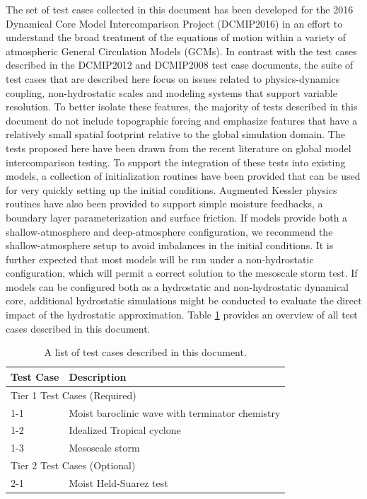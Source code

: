 \documentclass[times,doublespace]{fldauth}
\newcommand\T{\rule{0pt}{2.6ex}}
\newcommand\B{\rule[-1.2ex]{0pt}{0pt}}
\begin{document}
The set of test cases collected in this document has been developed for the 2016 Dynamical Core Model Intercomparison Project (DCMIP2016) in an effort to understand the broad treatment of the equations of motion within a variety of atmospheric General Circulation Models (GCMs). In contrast with the test cases described in the DCMIP2012 and DCMIP2008 test case documents, the suite of test cases that are described here focus on issues related to physics-dynamics coupling, non-hydrostatic scales and modeling systems that support variable resolution.  To better isolate these features, the majority of tests described in this document do not include topographic forcing and emphasize features that have a relatively small spatial footprint relative to the global simulation domain.  The tests proposed here have been drawn from the recent literature on global model intercomparison testing.  To support the integration of these tests into existing models, a collection of initialization routines have been provided that can be used for very quickly setting up the initial conditions.  Augmented Kessler physics routines have also been provided to support simple moisture feedbacks, a boundary layer parameterization and surface friction.  If models provide both a shallow-atmosphere and deep-atmosphere configuration, we recommend the shallow-atmosphere setup to avoid imbalances in the initial conditions. It is further expected that most models will be run under a non-hydrostatic configuration, which will permit a correct solution to the mesoscale storm test.  If models can be configured both as a hydrostatic and non-hydrostatic dynamical core, additional hydrostatic simulations might be conducted to evaluate the direct impact of the hydrostatic approximation.  Table \ref{tab:TestCases} provides an overview of all test cases described in this document.

\begin{table}[h]

\caption{A list of test cases described in this document.} \label{tab:TestCases}
\begin{tabular*}{\textwidth}{@{\extracolsep{\fill}}ll}
\hline Test Case \T \B& Description \\
\hline \multicolumn{2}{l}{Tier 1 Test Cases (Required)} \T \B \\
\hline 
1-1 \T & Moist baroclinic wave with terminator chemistry \\
1-2 \T & Idealized Tropical cyclone \\
1-3 \T & Mesoscale storm \\
\hline \multicolumn{2}{l}{Tier 2 Test Cases (Optional)} \T \B \\  \hline 
2-1 \T \B & Moist Held-Suarez test  \\ \hline
\hline 
\end{tabular*}

\end{table}
\end{document}
